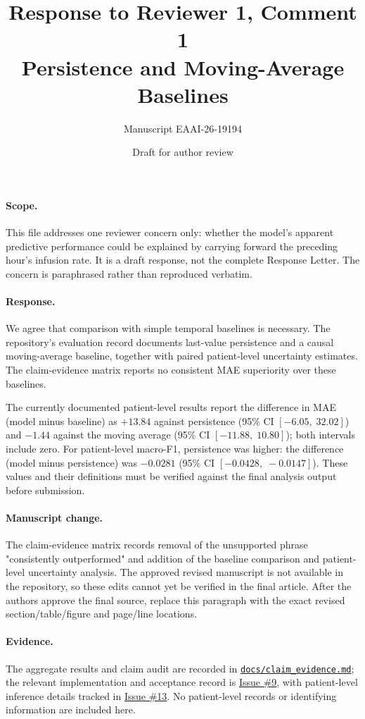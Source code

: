 \documentclass[11pt]{article}
\title{Response to Reviewer 1, Comment 1\\Persistence and Moving-Average Baselines}
\author{Manuscript EAAI-26-19194}
\date{Draft for author review}
\begin{document}
\maketitle

\paragraph{Scope.}
This file addresses one reviewer concern only: whether the model's apparent
predictive performance could be explained by carrying forward the preceding
hour's infusion rate. It is a draft response, not the complete Response Letter.
The concern is paraphrased rather than reproduced verbatim.

\paragraph{Response.}
We agree that comparison with simple temporal baselines is necessary. The
repository's evaluation record documents last-value persistence and a causal
moving-average baseline, together with paired patient-level uncertainty
estimates. The claim-evidence matrix reports no consistent MAE superiority
over these baselines.

The currently documented patient-level results report the difference in MAE
(model minus baseline) as $+13.84$ against persistence (95\% CI
$[-6.05,\;32.02]$) and $-1.44$ against the moving average (95\% CI
$[-11.88,\;10.80]$); both intervals include zero. For patient-level macro-F1,
persistence was higher: the difference (model minus persistence) was $-0.0281$
(95\% CI $[-0.0428,\;-0.0147]$). These values and their definitions must be
verified against the final analysis output before submission.

\paragraph{Manuscript change.}
The claim-evidence matrix records removal of the unsupported phrase
"consistently outperformed" and addition of the baseline comparison and
patient-level uncertainty analysis. The approved revised manuscript is not
available in the repository, so these edits cannot yet be verified in the
final article. After the authors approve the final source, replace this
paragraph with the exact revised section/table/figure and page/line locations.

\paragraph{Evidence.}
The aggregate results and claim audit are recorded in
\href{https://github.com/Aveouter/Fluid_Infusion_Decision/blob/main/docs/claim_evidence.md}{\texttt{docs/claim\_evidence.md}};
the relevant implementation and acceptance record is
\href{https://github.com/Aveouter/Fluid_Infusion_Decision/issues/9}{Issue \#9},
with patient-level inference details tracked in
\href{https://github.com/Aveouter/Fluid_Infusion_Decision/issues/13}{Issue \#13}.
No patient-level records or identifying information are included here.
\end{document}
